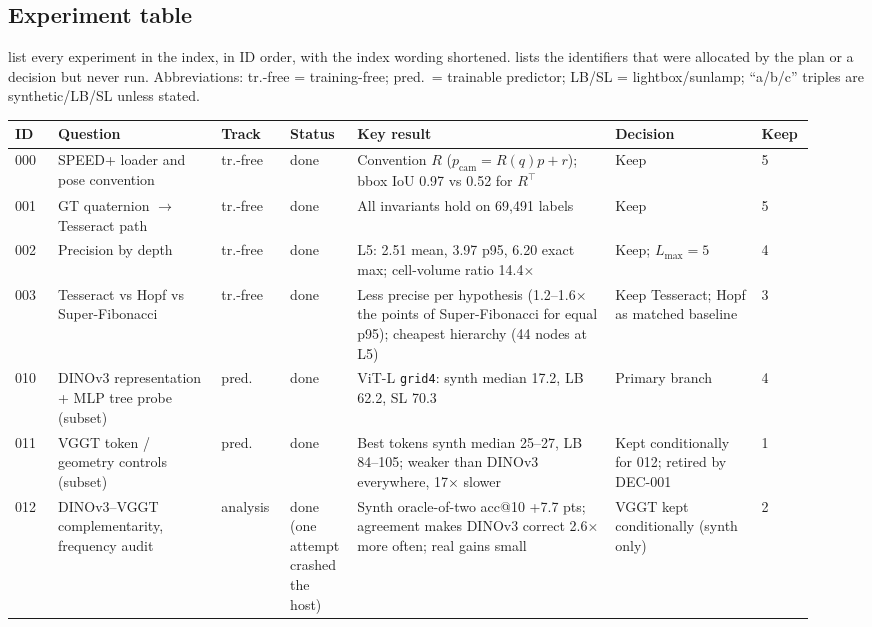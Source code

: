 \subsection{Experiment table}\label{app:log_table}

 list every experiment in the index, in ID order, with the index wording shortened.  lists the identifiers that were allocated by the plan or a decision but never run. Abbreviations: tr.-free = training-free; pred.\ = trainable predictor; LB/SL = lightbox/sunlamp; ``a/b/c'' triples are synthetic/LB/SL unless stated.

\begin{table}[p]
  \centering\footnotesize
  \setlength{\tabcolsep}{2.5pt}
  \begin{tabular}{@{}p{0.05\linewidth}p{0.19\linewidth}p{0.085\linewidth}p{0.075\linewidth}p{0.305\linewidth}p{0.17\linewidth}p{0.05\linewidth}@{}}
    \toprule
    ID & Question & Track & Status & Key result & Decision & Keep \\
    \midrule
    000 & SPEED+ loader and pose convention & tr.-free & done & Convention $R$ ($p_\text{cam}=R(q)p+r$); bbox IoU 0.97 vs 0.52 for $R^\top$ & Keep & 5 \\
    001 & GT quaternion $\to$ Tesseract path & tr.-free & done & All invariants hold on 69,491 labels & Keep & 5 \\
    002 & Precision by depth & tr.-free & done & L5: 2.51 mean, 3.97 p95, 6.20 exact max; cell-volume ratio 14.4$\times$ & Keep; $L_\text{max}=5$ & 4 \\
    003 & Tesseract vs Hopf vs Super-Fibonacci & tr.-free & done & Less precise per hypothesis (1.2--1.6$\times$ the points of Super-Fibonacci for equal p95); cheapest hierarchy (44 nodes at L5) & Keep Tesseract; Hopf as matched baseline & 3 \\
    010 & DINOv3 representation + MLP tree probe (subset) & pred. & done & ViT-L \texttt{grid4}: synth median 17.2, LB 62.2, SL 70.3 & Primary branch & 4 \\
    011 & VGGT token / geometry controls (subset) & pred. & done & Best tokens synth median 25--27, LB 84--105; weaker than DINOv3 everywhere, 17$\times$ slower & Kept conditionally for 012; retired by DEC-001 & 1 \\
    012 & DINOv3--VGGT complementarity, frequency audit & analysis & done (one attempt crashed the host) & Synth oracle-of-two acc@10 +7.7 pts; agreement makes DINOv3 correct 2.6$\times$ more often; real gains small & VGGT kept conditionally (synth only) & 2 \\

\end{tabular}
\end{table}
